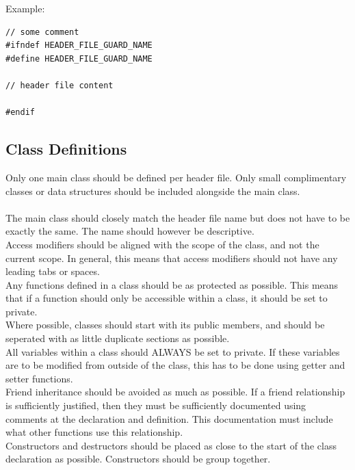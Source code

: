 \documentclass[12pt,article]{memoir}
\begin{document}
\noindent
Example:
\begin{lstlisting}
// some comment
#ifndef HEADER_FILE_GUARD_NAME
#define HEADER_FILE_GUARD_NAME

// header file content

#endif
\end{lstlisting}

\newpage
\subsection{Class Definitions}
\noindent
Only one main class should be defined per header file. Only small complimentary classes or data structures should be included alongside the main class.\\\\

\noindent
The main class should closely match the header file name but does not have to be exactly the same. The name should however be descriptive.\\

\noindent
Access modifiers should be aligned with the scope of the class, and not the current scope. In general, this means that access modifiers should not have any leading tabs or spaces.\\

\noindent
Any functions defined in a class should be as protected as possible. This means that if a function should only be accessible within a class, it should be set to private.\\

\noindent
Where possible, classes should start with its public members, and should be seperated with as little duplicate sections as possible.\\

\noindent
All variables within a class should ALWAYS be set to private. If these variables are to be modified from outside of the class, this has to be done using getter and setter functions.\\

\noindent
Friend inheritance should be avoided as much as possible. If a friend relationship is sufficiently justified, then they must be sufficiently documented using comments at the declaration and definition. This documentation must include what other functions use this relationship.\\

\noindent
Constructors and destructors should be placed as close to the start of the class declaration as possible. Constructors should be group together.\\
\end{document}
